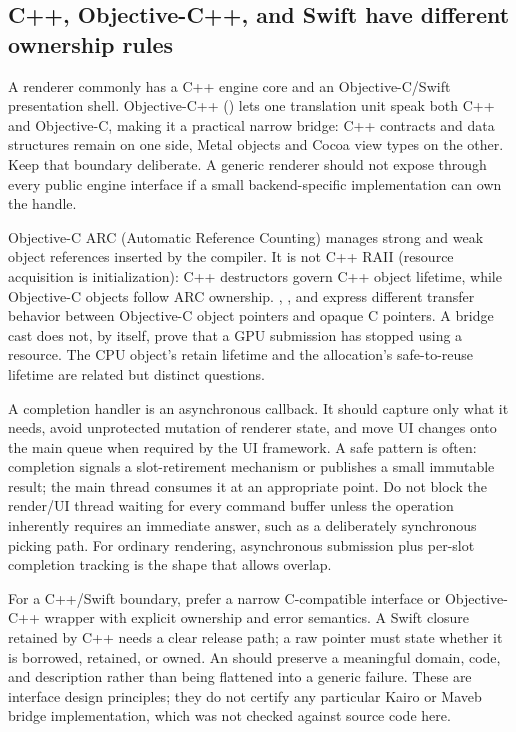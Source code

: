 \subsection{C++, Objective-C++, and Swift have different ownership rules}\label{05-engine-i-ch019-c-objective-c-and-swift-have-different-ownership-rules}

\hypertarget{05-engine-i-ch019-c-objective-c-and-swift-have-different-ownership-rules}{}

A renderer commonly has a C++ engine core and an Objective-C/Swift presentation shell. Objective-C++ () lets one translation unit speak both C++ and Objective-C, making it a practical narrow bridge: C++ contracts and data structures remain on one side, Metal objects and Cocoa view types on the other. Keep that boundary deliberate. A generic renderer should not expose  through every public engine interface if a small backend-specific implementation can own the handle.

Objective-C ARC (Automatic Reference Counting) manages strong and weak object references inserted by the compiler. It is not C++ RAII (resource acquisition is initialization): C++ destructors govern C++ object lifetime, while Objective-C objects follow ARC ownership. , , and  express different transfer behavior between Objective-C object pointers and opaque C pointers. A bridge cast does not, by itself, prove that a GPU submission has stopped using a resource. The CPU object's retain lifetime and the allocation's safe-to-reuse lifetime are related but distinct questions.

A completion handler is an asynchronous callback. It should capture only what it needs, avoid unprotected mutation of renderer state, and move UI changes onto the main queue when required by the UI framework. A safe pattern is often: completion signals a slot-retirement mechanism or publishes a small immutable result; the main thread consumes it at an appropriate point. Do not block the render/UI thread waiting for every command buffer unless the operation inherently requires an immediate answer, such as a deliberately synchronous picking path. For ordinary rendering, asynchronous submission plus per-slot completion tracking is the shape that allows overlap.

For a C++/Swift boundary, prefer a narrow C-compatible interface or Objective-C++ wrapper with explicit ownership and error semantics. A Swift closure retained by C++ needs a clear release path; a raw pointer must state whether it is borrowed, retained, or owned. An  should preserve a meaningful domain, code, and description rather than being flattened into a generic failure. These are interface design principles; they do not certify any particular Kairo or Maveb bridge implementation, which was not checked against source code here.

